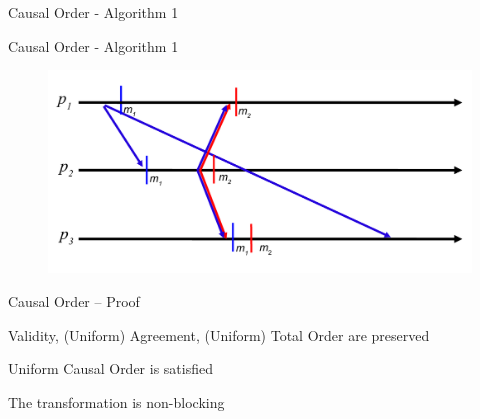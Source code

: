 \begin{frame}[shrink=5]{Causal Order - Algorithm 1}

\begin{Procedure}
\caption{Causal Order Transformation executed by process $p$}

\BlankLine
{}

\end{Procedure}

\end{frame}

\begin{frame}{Causal Order - Algorithm 1}
	
\begin{figure}
	\includegraphics[width=\textwidth]{figs/04/rb-crb}
\end{figure}

\end{frame}

\begin{frame}{Causal Order -- Proof}

\BIL
\item \alert{Validity}, \alert{(Uniform) Agreement}, \alert{(Uniform) Total Order} are preserved
\item \alert{Uniform Causal Order} is satisfied
\item The transformation is non-blocking
\EIL

\end{frame}



